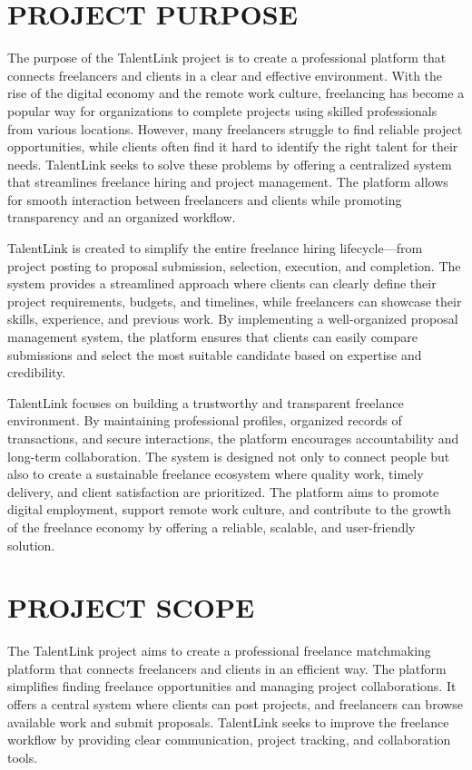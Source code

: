\documentclass[12pt,a4paper,oneside]{report}
\numberwithin{figure}{chapter}
\numberwithin{table}{chapter}
\begin{document}
\section{PROJECT PURPOSE}

The purpose of the TalentLink project is to create a professional platform that connects
freelancers and clients in a clear and effective environment. With the rise of the digital
economy and the remote work culture, freelancing has become a popular way for
organizations to complete projects using skilled professionals from various locations.
However, many freelancers struggle to find reliable project opportunities, while clients
often find it hard to identify the right talent for their needs. TalentLink seeks to solve
these problems by offering a centralized system that streamlines freelance hiring and
project management. The platform allows for smooth interaction between freelancers and
clients while promoting transparency and an organized workflow.

\indent TalentLink is created to simplify the entire freelance hiring lifecycle---from
project posting to proposal submission, selection, execution, and completion. The system
provides a streamlined approach where clients can clearly define their project
requirements, budgets, and timelines, while freelancers can showcase their skills,
experience, and previous work. By implementing a well-organized proposal management
system, the platform ensures that clients can easily compare submissions and select the
most suitable candidate based on expertise and credibility.

\indent TalentLink focuses on building a trustworthy and transparent freelance
environment. By maintaining professional profiles, organized records of transactions, and
secure interactions, the platform encourages accountability and long-term collaboration.
The system is designed not only to connect people but also to create a sustainable
freelance ecosystem where quality work, timely delivery, and client satisfaction are
prioritized. The platform aims to promote digital employment, support remote work
culture, and contribute to the growth of the freelance economy by offering a reliable,
scalable, and user-friendly solution.

\section{PROJECT SCOPE}

The TalentLink project aims to create a professional freelance matchmaking platform that
connects freelancers and clients in an efficient way. The platform simplifies finding
freelance opportunities and managing project collaborations. It offers a central system
where clients can post projects, and freelancers can browse available work and submit
proposals. TalentLink seeks to improve the freelance workflow by providing clear
communication, project tracking, and collaboration tools.
\end{document}
